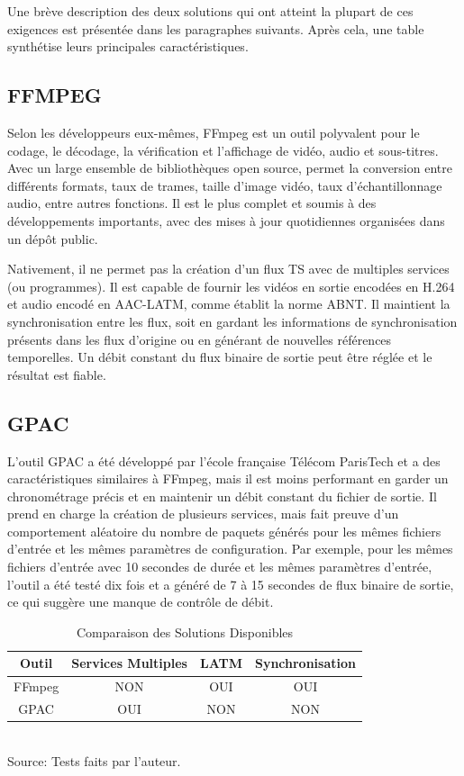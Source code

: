 \documentclass[12pt,a4paper]{article}
\begin{document}
Une brève description des deux solutions qui ont atteint la plupart de ces exigences est présentée dans les paragraphes suivants. Après cela, une table synthétise leurs principales caractéristiques.

\subsection{FFMPEG}

Selon les développeurs eux-mêmes, FFmpeg est un outil polyvalent pour le codage, le décodage, la vérification et l'affichage de vidéo, audio et sous-titres. Avec un large ensemble de bibliothèques open source, permet la conversion entre différents formats, taux de trames, taille d'image vidéo, taux d'échantillonnage audio, entre autres fonctions. Il est le plus complet et soumis à des développements importants, avec des mises à jour quotidiennes organisées dans un dépôt public.

Nativement, il ne permet pas la création d'un flux TS avec de multiples services (ou programmes). Il est capable de fournir les vidéos en sortie encodées en H.264 et audio encodé en AAC-LATM, comme établit la norme ABNT. Il maintient la synchronisation entre les flux, soit en gardant les informations de synchronisation présents dans les flux d'origine ou en générant de nouvelles références temporelles. Un débit constant du flux binaire de sortie peut être réglée et le résultat est fiable.

\subsection{GPAC}

L'outil GPAC a été développé par l'école française Télécom ParisTech et a des caractéristiques similaires à FFmpeg, mais il est moins performant en garder un chronométrage précis et en maintenir un débit constant du fichier de sortie. Il prend en charge la création de plusieurs services, mais fait preuve d'un comportement aléatoire du nombre de paquets générés pour les mêmes fichiers d'entrée et les mêmes paramètres de configuration. Par exemple, pour les mêmes fichiers d'entrée avec 10 secondes de durée et les mêmes paramètres d'entrée, l'outil a été testé dix fois et a généré de 7 à 15 secondes de flux binaire de sortie, ce qui suggère une manque de contrôle de débit.

\begin{table}[!htpd]
\caption{Comparaison des Solutions Disponibles}
\begin{center}
\begin{tabular}{|c|c|c|c|}
\hline
Outil & Services Multiples & LATM & Synchronisation\\
\hline
FFmpeg & NON & OUI & OUI\\
\hline
GPAC & OUI & NON & NON\\
\hline
\end{tabular}
\label{tab_comparison_tools}
\\Source: Tests faits par l'auteur.
\end{center}
\end{table}
\end{document}
